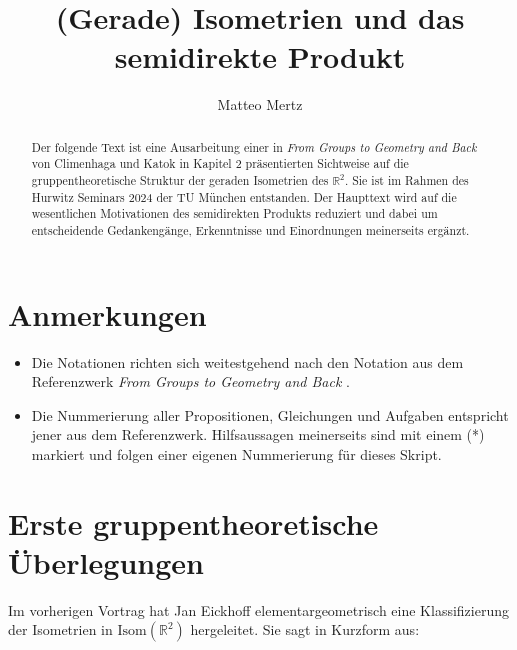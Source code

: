\documentclass[a4paper, ngerman]{article}
\title{(Gerade) Isometrien und das semidirekte Produkt}
\author{Matteo Mertz}
\numberwithin{equation}{chapter}
\theoremstyle{plain}
\theoremstyle{definition}
\newcommand{\anm}[1]{{\color{red} #1}}
\begin{document}
\setcounter{proposition}{7}

\maketitle

\begin{abstract}
    Der folgende Text ist eine Ausarbeitung einer in \textit{From Groups to Geometry and Back} von Climenhaga und Katok \cite{referenzwerk} in Kapitel 2 präsentierten Sichtweise auf die gruppentheoretische Struktur der geraden Isometrien des \(\mathbb R^2\). Sie ist im Rahmen des Hurwitz Seminars 2024 der TU München entstanden. Der Haupttext wird auf die wesentlichen Motivationen des semidirekten Produkts reduziert und dabei um entscheidende Gedankengänge, Erkenntnisse und Einordnungen meinerseits ergänzt.  
\end{abstract}

\section*{Anmerkungen}
\begin{itemize}
    \item Die Notationen richten sich weitestgehend nach den Notation aus dem Referenzwerk \textit{From Groups to Geometry and Back} \cite{referenzwerk}. 
    \item Die Nummerierung aller Propositionen, Gleichungen und Aufgaben entspricht jener aus dem Referenzwerk. Hilfsaussagen meinerseits sind mit einem (*) markiert und folgen einer eigenen Nummerierung für dieses Skript. 
\end{itemize}

\section{Erste gruppentheoretische Überlegungen}\label{sec:wiederholung}
Im vorherigen Vortrag %
hat Jan Eickhoff elementargeometrisch eine Klassifizierung der Isometrien in \(\mathrm{Isom}(\mathbb R^2)\) hergeleitet. Sie sagt in Kurzform aus: 
\end{document}
